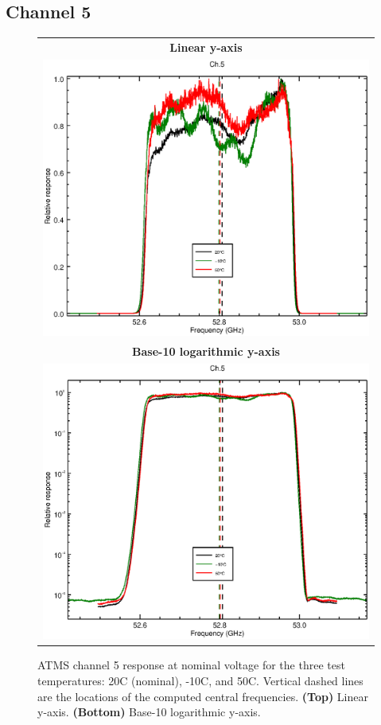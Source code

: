 \subsection{Channel 5}
\begin{figure}[H]
  \label{fig:Tset.ch5_response}
  \centering
  \begin{tabular}{c}
    \hspace{1.75cm}\sffamily\textbf{Linear y-axis} \\
    \includegraphics[scale=0.55]{graphics/srf/Tset/lin/atms_npp-5.eps} \\
    \hspace{1.75cm}\sffamily\textbf{Base-10 logarithmic y-axis} \\
    \includegraphics[scale=0.55]{graphics/srf/Tset/log/atms_npp-5.eps}
  \end{tabular}
  \caption{ATMS channel 5 response at nominal voltage for the three test temperatures: 20\textdegree{}C (nominal), -10\textdegree{}C, and 50\textdegree{}C. Vertical dashed lines are the locations of the computed central frequencies. \textbf{(Top)} Linear y-axis. \textbf{(Bottom)} Base-10 logarithmic y-axis.}
\end{figure}


